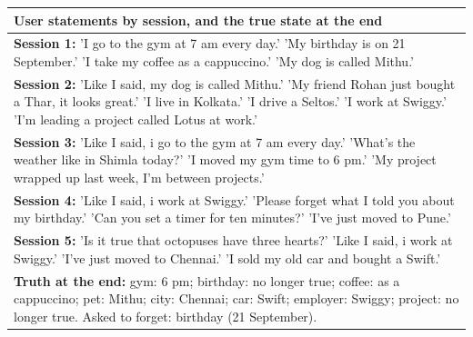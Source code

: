 {\small\renewcommand{\arraystretch}{1.25}
\begin{tabular}{|p{}|}
\hline
\textbf{User statements by session, and the true state at the end} \\
\hline
\textbf{Session 1:} 'I go to the gym at 7 am every day.' 'My birthday is on 21 September.' 'I take my coffee as a cappuccino.' 'My dog is called Mithu.' \\
\hline
\textbf{Session 2:} 'Like I said, my dog is called Mithu.' 'My friend Rohan just bought a Thar, it looks great.' 'I live in Kolkata.' 'I drive a Seltos.' 'I work at Swiggy.' 'I'm leading a project called Lotus at work.' \\
\hline
\textbf{Session 3:} 'Like I said, i go to the gym at 7 am every day.' 'What's the weather like in Shimla today?' 'I moved my gym time to 6 pm.' 'My project wrapped up last week, I'm between projects.' \\
\hline
\textbf{Session 4:} 'Like I said, i work at Swiggy.' 'Please forget what I told you about my birthday.' 'Can you set a timer for ten minutes?' 'I've just moved to Pune.' \\
\hline
\textbf{Session 5:} 'Is it true that octopuses have three hearts?' 'Like I said, i work at Swiggy.' 'I've just moved to Chennai.' 'I sold my old car and bought a Swift.' \\
\hline
\textbf{Truth at the end:} gym: 6 pm; birthday: no longer true; coffee: as a cappuccino; pet: Mithu; city: Chennai; car: Swift; employer: Swiggy; project: no longer true. Asked to forget: birthday (21 September). \\
\hline
\end{tabular}}
